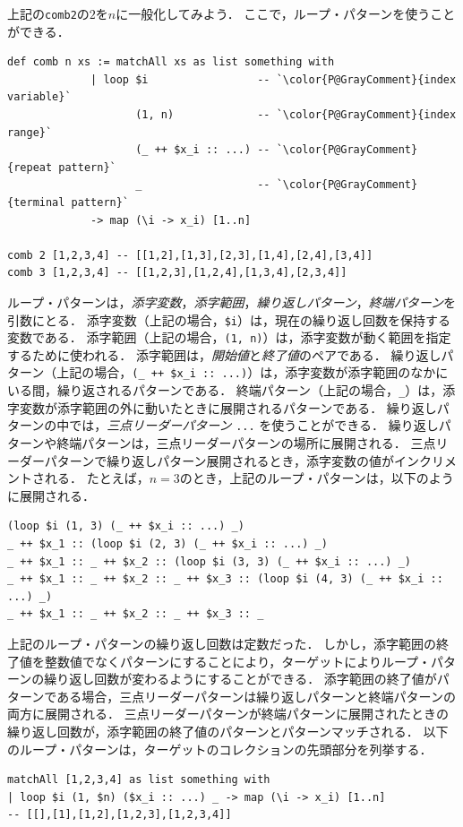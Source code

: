 上記の\lstinline{comb2}の$2$を$n$に一般化してみよう．
ここで，ループ・パターンを使うことができる．
\begin{lstlisting}[language=egison,numbers=none]
def comb n xs := matchAll xs as list something with
             | loop $i                 -- `\color{P@GrayComment}{index variable}`
                    (1, n)             -- `\color{P@GrayComment}{index range}`
                    (_ ++ $x_i :: ...) -- `\color{P@GrayComment}{repeat pattern}`
                    _                  -- `\color{P@GrayComment}{terminal pattern}`
             -> map (\i -> x_i) [1..n]

comb 2 [1,2,3,4] -- [[1,2],[1,3],[2,3],[1,4],[2,4],[3,4]]
comb 3 [1,2,3,4] -- [[1,2,3],[1,2,4],[1,3,4],[2,3,4]]
\end{lstlisting}
ループ・パターンは，\emph{添字変数}，\emph{添字範囲}，\emph{繰り返しパターン}，\emph{終端パターン}を引数にとる．
添字変数（上記の場合，\lstinline{$i}）は，現在の繰り返し回数を保持する変数である．
添字範囲（上記の場合，\lstinline{(1, n)}）は，添字変数が動く範囲を指定するために使われる．
添字範囲は，\emph{開始値}と\emph{終了値}のペアである．
繰り返しパターン（上記の場合，\lstinline{(_ ++ $x_i :: ...)}）は，添字変数が添字範囲のなかにいる間，繰り返されるパターンである．
終端パターン（上記の場合，\lstinline{_}）は，添字変数が添字範囲の外に動いたときに展開されるパターンである．
繰り返しパターンの中では，\emph{三点リーダーパターン} \lstinline{...} を使うことができる．
繰り返しパターンや終端パターンは，三点リーダーパターンの場所に展開される．
三点リーダーパターンで繰り返しパターン展開されるとき，添字変数の値がインクリメントされる．
たとえば，$n=3$のとき，上記のループ・パターンは，以下のように展開される．
\begin{lstlisting}[language=egison]
(loop $i (1, 3) (_ ++ $x_i :: ...) _)
_ ++ $x_1 :: (loop $i (2, 3) (_ ++ $x_i :: ...) _)
_ ++ $x_1 :: _ ++ $x_2 :: (loop $i (3, 3) (_ ++ $x_i :: ...) _)
_ ++ $x_1 :: _ ++ $x_2 :: _ ++ $x_3 :: (loop $i (4, 3) (_ ++ $x_i :: ...) _)
_ ++ $x_1 :: _ ++ $x_2 :: _ ++ $x_3 :: _
\end{lstlisting}

上記のループ・パターンの繰り返し回数は定数だった．
しかし，添字範囲の終了値を整数値でなくパターンにすることにより，ターゲットによりループ・パターンの繰り返し回数が変わるようにすることができる．
添字範囲の終了値がパターンである場合，三点リーダーパターンは繰り返しパターンと終端パターンの両方に展開される．
三点リーダーパターンが終端パターンに展開されたときの繰り返し回数が，添字範囲の終了値のパターンとパターンマッチされる．
以下のループ・パターンは，ターゲットのコレクションの先頭部分を列挙する．
\begin{lstlisting}[language=egison,numbers=none]
matchAll [1,2,3,4] as list something with
| loop $i (1, $n) ($x_i :: ...) _ -> map (\i -> x_i) [1..n]
-- [[],[1],[1,2],[1,2,3],[1,2,3,4]]
\end{lstlisting}

